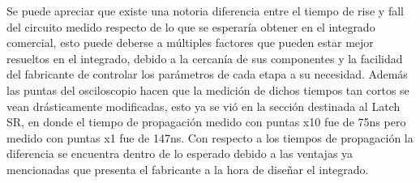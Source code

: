 %
\noindent
Se puede apreciar que existe una notoria diferencia entre el tiempo de rise y fall del circuito medido respecto de lo que se esperaría obtener en el integrado comercial, esto puede deberse a múltiples factores que pueden estar mejor resueltos en el integrado, debido a la cercanía de sus componentes y la facilidad del fabricante de controlar los parámetros de cada etapa a su necesidad. Además las puntas del osciloscopio hacen que la medición de dichos tiempos tan cortos se vean drásticamente modificadas, esto ya se vió en la sección destinada al Latch SR, en donde el tiempo de propagación medido con puntas x10 fue de 75ns pero medido con puntas x1 fue de 147ns.   
Con respecto a los tiempos de propagaci\'on la diferencia se encuentra dentro de lo esperado debido a las ventajas ya mencionadas que presenta el fabricante a la hora de diseñar el integrado.